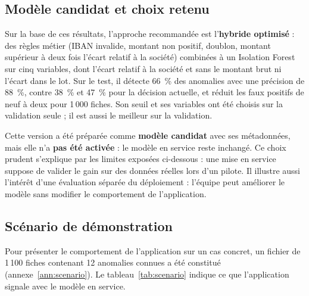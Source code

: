 \subsection{Modèle candidat et choix retenu}

Sur la base de ces résultats, l'approche recommandée est l'\textbf{hybride optimisé} : des règles métier (IBAN invalide, montant non positif, doublon, montant supérieur à deux fois l'écart relatif à la société) combinées à un Isolation Forest sur cinq variables, dont l'écart relatif à la société et sans le montant brut ni l'écart dans le lot. Sur le test, il détecte 66~\% des anomalies avec une précision de 88~\%, contre 38~\% et 47~\% pour la décision actuelle, et réduit les faux positifs de neuf à deux pour 1\,000 fiches. Son seuil et ses variables ont été choisis sur la validation seule ; il est aussi le meilleur sur la validation.

Cette version a été préparée comme \textbf{modèle candidat} avec ses métadonnées, mais elle n'a \textbf{pas été activée} : le modèle en service reste inchangé. Ce choix prudent s'explique par les limites exposées ci-dessous : une mise en service suppose de valider le gain sur des données réelles lors d'un pilote. Il illustre aussi l'intérêt d'une évaluation séparée du déploiement : l'équipe peut améliorer le modèle sans modifier le comportement de l'application.

\subsection{Scénario de démonstration}

Pour présenter le comportement de l'application sur un cas concret, un fichier de 1\,100 fiches contenant 12 anomalies connues a été constitué (annexe~\ref{ann:scenario}). Le tableau~\ref{tab:scenario} indique ce que l'application signale avec le modèle en service.

